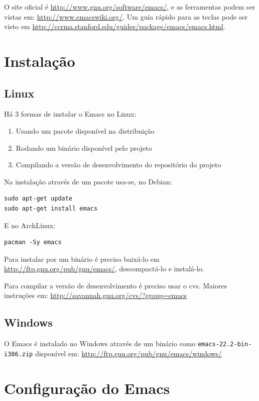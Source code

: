 \documentclass[12pt,brazil]{book}
\begin{document}
O site oficial é \url{http://www.gnu.org/software/emacs/}, e as
ferramentas podem ser vistas em: \url{http://www.emacswiki.org/}. Um
guia rápido para as teclas pode ser visto em
\url{http://ccrma.stanford.edu/guides/package/emacs/emacs.html}.

\section{Instalação}
\label{sec:instalacao-7}

\subsection{Linux}
\label{sec:linux}

Há 3 formas de instalar o Emacs no Linux:

\begin{enumerate}
\item Usando um pacote disponível na distribuição
\item Rodando um binário disponível pelo projeto
\item Compilando a versão de desenvolvimento do repositório do projeto
\end{enumerate}

Na instalação através de um pacote usa-se, no Debian:

\begin{verbatim}
sudo apt-get update
sudo apt-get install emacs
\end{verbatim}

E no ArchLinux:

\begin{verbatim}
pacman -Sy emacs
\end{verbatim}

Para instalar por um binário é preciso baixá-lo em
\url{http://ftp.gnu.org/pub/gnu/emacs/}, descompactá-lo e instalá-lo.

Para compilar a versão de desenvolvimento é preciso usar o
cvs. Maiores instruções em:
\url{http://savannah.gnu.org/cvs/?group=emacs}

\subsection{Windows}
\label{sec:windows}

O Emacs é instalado no Windows através de um binário como
\texttt{emacs-22.2-bin-i386.zip} disponível em:
\url{http://ftp.gnu.org/pub/gnu/emacs/windows/}

\section{Configuração do Emacs}
\label{sec:conf-do-emacs}
\end{document}
